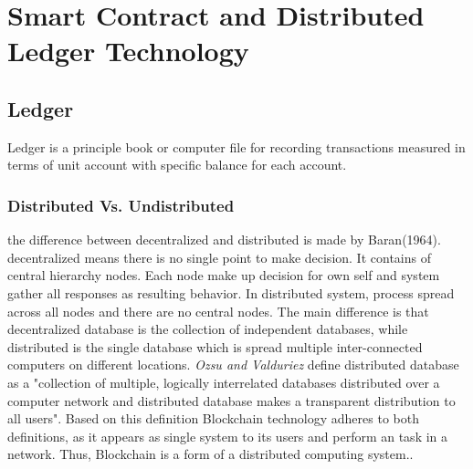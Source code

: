 \chapter{Smart Contract and Distributed Ledger Technology}

\section{Ledger}
Ledger is a principle book or computer file for recording transactions measured in terms of unit account with specific balance for each account\cite{Markos}.

\subsection{Distributed Vs. Undistributed }
the difference between decentralized and distributed is made by Baran(1964). decentralized means there is no single point to make decision. It contains of central hierarchy nodes. Each node make up decision for own self and system gather all responses as resulting behavior. In distributed system, process spread across all nodes and there are no central nodes. The main difference is that decentralized database is the collection of independent databases, while distributed is the single database which is spread multiple inter-connected computers on different locations. \textit{Ozsu and Valduriez} define distributed database as a "collection of multiple, logically interrelated databases distributed over a computer network and distributed database makes a transparent distribution to all users"\cite{Ozsu}. Based on this definition Blockchain technology adheres to both definitions, as it appears as single system to its users and  perform an task in a network. Thus, Blockchain is a form of a distributed computing system.\cite{Markos}.


